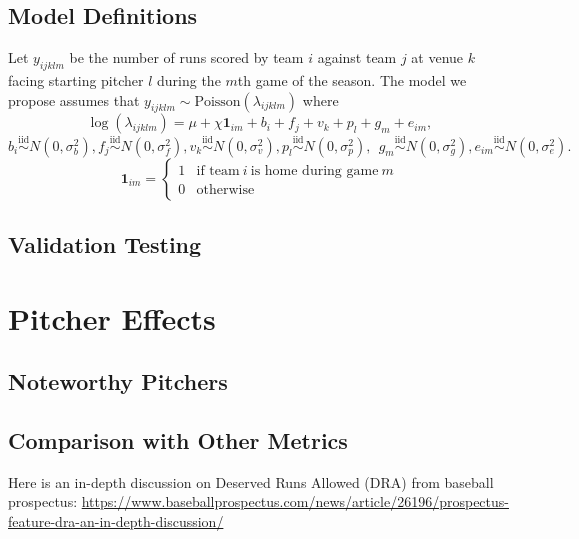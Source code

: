 \documentclass [52pt] {article}
\newcommand{\simiid}{\overset{\text{iid}}{\sim}}
\begin{document}
\subsection{Model Definitions}
Let $y_{ijklm}$ be the number of runs scored by team $i$ against team $j$ at venue $k$ facing starting pitcher $l$ during the $m$th game of the season.  The model we propose assumes that $y_{ijklm}\sim\text{Poisson}(\lambda_{ijklm})$ where
\begin{equation}\label{eq : model1}
\log(\lambda_{ijklm}) = \mu + \chi \mathbf{1}_{im} + b_i + f_j + v_k + p_l + g_m + e_{im},
\end{equation}
\[b_i\simiid N(0,\sigma^2_b), f_j\simiid N(0,\sigma^2_f), v_k\simiid N(0,\sigma^2_v), p_l\simiid N(0, \sigma^2_p),\:\:g_m\simiid N(0, \sigma^2_g), e_{im}\simiid N(0,\sigma^2_e).\]
\[\mathbf{1}_{im} = \begin{cases}
1 & \text{if team}\:i\:\text{is home during game}\:m\\
0 &\text{otherwise}
\end{cases}\]

\subsection{Validation Testing}

\section{Pitcher Effects}

\subsection{Noteworthy Pitchers}

\subsection{Comparison with Other Metrics}

Here is an in-depth discussion on Deserved Runs Allowed (DRA) from baseball prospectus:
\url{https://www.baseballprospectus.com/news/article/26196/prospectus-feature-dra-an-in-depth-discussion/}
\end{document}
